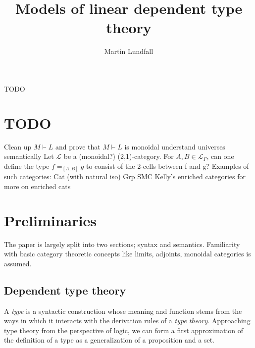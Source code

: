 
\usepackage[margin=0.5in]{geometry}

\title{Models of linear dependent type theory}
\author{Martin Lundfall}
\maketitle
\abstract
TODO
\newpage
\tableofcontents
\newpage
\section{TODO}
Clean up $M \vdash L$ and prove that $M \vdash L$ is monoidal
understand universes semantically
Let $\mathcal{L}$ be a (monoidal?) (2,1)-category. For $A, B \in \mathcal{L}_{\Gamma}$, can one define the type $f =_{[A, B]} g$ to consist of the 2-cells between f and g?
Examples of such categories:
Cat (with natural iso)
Grp
SMC
Kelly's enriched categories for more on enriched cats
\section{Preliminaries}
The paper is largely split into two sections; syntax and semantics. 
Familiarity with basic category theoretic concepts like limits, adjoints, monoidal categories is assumed.
\subsection{Dependent type theory}
A \textit{type} is a syntactic construction whose meaning and function stems from the ways in which it interacts with the derivation rules of a \textit{type theory}. Approaching type theory from the perspective of logic, we can form a first approximation of the definition of a type as a generalization of a proposition and a set.
